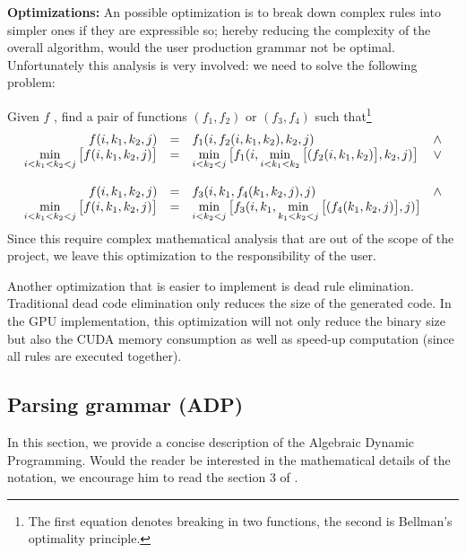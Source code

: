 \item \textbf{Optimizations:} An possible optimization is to break down complex rules into simpler ones if they are expressible so; hereby reducing the complexity of the overall algorithm, would the user production grammar not be optimal. Unfortunately this analysis is very involved: we need to solve the following problem:

Given $f$ , find a pair of functions $(f_1,f_2)$ or $(f_3,f_4)$ such that\footnote{The first equation denotes breaking in two functions, the second is Bellman's optimality principle.}
\[\begin{array}{rcll}
f(i,k_1,k_2,j) &=& f_1(i,f_2(i,k_1,k_2),k_2,j) & \land \\
	\min\limits_{i<k_1<k_2<j}\big[ f(i,k_1,k_2,j) \big] &=& \min\limits_{i<k_2<j} \big[ f_1(i,\min\limits_{i<k_1<k_2} \big[ (f_2(i,k_1,k_2  ) \big],k_2,j) \big] & \lor \vspace{12pt} \\
f(i,k_1,k_2,j) &=& f_3(i,k_1,f_4(k_1,k_2,j),j) & \land \\
	\min\limits_{i<k_1<k_2<j}\big[ f(i,k_1,k_2,j) \big] &=& \min\limits_{i<k_2<j} \big[ f_3(i,k_1,\min\limits_{k_1<k_2<j} \big[ (f_4(k_1,k_2,j) \big],j) \big]
\end{array}\]
Since this require complex mathematical analysis that are out of the scope of the project, we leave this optimization to the responsibility of the user.

Another optimization that is easier to implement is dead rule elimination. Traditional dead code elimination only reduces the size of the generated code. In the GPU implementation, this optimization will not only reduce the binary size but also the CUDA memory consumption as well as speed-up computation (since all rules are executed together).
\ule

\newpage
\subsection{Parsing grammar (ADP)}
In this section, we provide a concise description of the Algebraic Dynamic Programming. Would the reader be interested in the mathematical details of the notation, we encourage him to read the section 3 of \cite{adp}.

